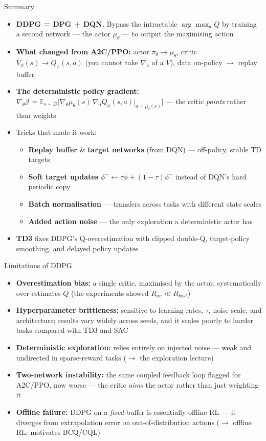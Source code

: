 \begin{frame}{Summary}
\begin{itemize}
    \item \textbf{DDPG = DPG + DQN.} Bypass the intractable $\arg\max_a Q$ by training a second network --- the actor $\mu_\theta$ --- to output the maximising action
    \item \textbf{What changed from A2C/PPO:} actor $\pi_\theta \to \mu_\theta$, critic $V_\phi(s) \to Q_\phi(s,a)$ (you cannot take $\nabla_a$ of a $V$), data on-policy $\to$ replay buffer
    \item \textbf{The deterministic policy gradient:}
    $\nabla_\theta \mathcal{J} = \mathbb{E}_{s \sim \mathcal{D}}\big[\nabla_\theta \mu_\theta(s)\, \nabla_a Q_\phi(s,a)|_{a=\mu_\theta(s)}\big]$ --- the critic \emph{points} rather than weights
    \item Tricks that made it work:
    \begin{itemize}
        \item \textbf{Replay buffer} \& \textbf{target networks} (from DQN) --- off-policy, stable TD targets
        \item \textbf{Soft target updates} $\phi^{-} \leftarrow \tau\phi + (1-\tau)\phi^{-}$ instead of DQN's hard periodic copy
        \item \textbf{Batch normalisation} --- transfers across tasks with different state scales
        \item \textbf{Added action noise} --- the only exploration a deterministic actor has
    \end{itemize}
    \item \textbf{TD3} fixes DDPG's Q-overestimation with clipped double-Q, target-policy smoothing, and delayed policy updates
\end{itemize}
\end{frame}

\begin{frame}{Limitations of DDPG}
\begin{itemize}
    \item \textbf{Overestimation bias:} a single critic, maximised by the actor, systematically over-estimates $Q$ (the experiments showed $R_{av} \ll R_{best}$)
    \item \textbf{Hyperparameter brittleness:} sensitive to learning rates, $\tau$, noise scale, and architecture; results vary widely across seeds, and it scales poorly to harder tasks compared with TD3 and SAC
    \item \textbf{Deterministic exploration:} relies entirely on injected noise --- weak and undirected in sparse-reward tasks ($\rightarrow$ the exploration lecture)
    \item \textbf{Two-network instability:} the same coupled feedback loop flagged for A2C/PPO, now worse --- the critic \emph{aims} the actor rather than just weighting it
    \item \textbf{Offline failure:} DDPG on a \emph{fixed} buffer is essentially offline RL --- it diverges from extrapolation error on out-of-distribution actions ($\rightarrow$ offline RL: motivates BCQ/CQL)
\end{itemize}
\end{frame}
